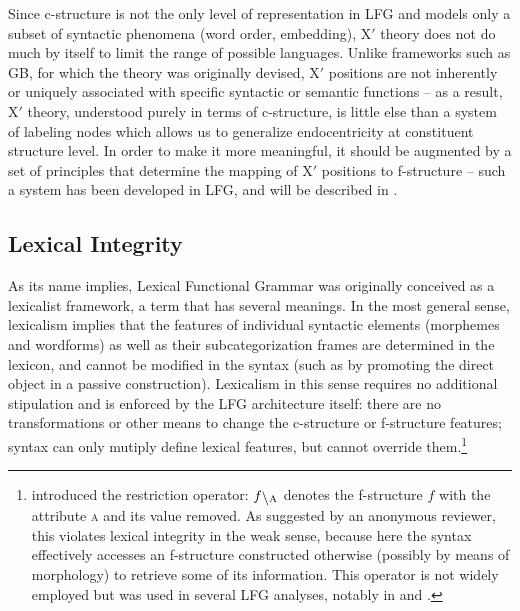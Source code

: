 \documentclass[output=paper,hidelinks]{langscibook}
\begin{document}
Since c-structure is not the only level of representation in LFG and models only a subset of syntactic phenomena (word order, embedding), X$'$ theory does not do much by itself to limit the range of possible languages. Unlike frameworks such as GB, for which the theory was originally devised, X$'$ positions are not inherently or uniquely associated with specific syntactic or semantic functions -- as a result, X$'$ theory, understood purely in terms of c-structure, is little else than a system of labeling nodes which allows us to generalize endocentricity at constituent structure level. In order to make it more meaningful, it should be augmented by a set of principles that determine the mapping of X$'$ positions to f-structure -- such a system has been developed in LFG, and will be described in .
%  
 
 \subsection{Lexical Integrity\label{sect:integrity}}
 
 As its name implies, Lexical Functional Grammar was originally conceived as a lexicalist framework, a term that has several meanings. In the most general sense, lexicalism implies that the features of individual syntactic elements (morphemes and wordforms) as well as their subcategorization frames are determined in the lexicon, and cannot be modified in the syntax (such as by promoting the direct object in a passive construction). Lexicalism in this sense requires no additional stipulation and is enforced by the LFG architecture itself: there are no transformations or other means to change the c-structure or f-structure features; syntax can only mutiply define lexical features, but cannot override them.\footnote{\textcite{kaplanwedekind93} introduced the restriction operator: $f\restrict{A}$ denotes the f-structure $f$ with the attribute \textsc{a} and its value removed. As suggested by an anonymous reviewer, this violates lexical integrity in the weak sense, because here the syntax effectively accesses an f-structure constructed otherwise (possibly by means of morphology) to retrieve some of its information. This operator is not widely employed but was used in several LFG analyses, notably in \textcite{Asudeh12} and \textcite{falk2010}.}
 
\end{document}
